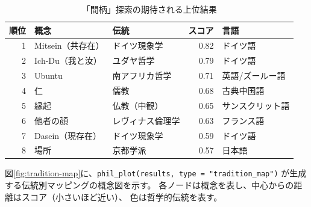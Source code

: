 \documentclass[a4paper,11pt]{ltjsarticle}
\begin{document}
\begin{table}[H]
\centering
\caption{「間柄」探索の期待される上位結果}
\label{tab:aidagara-results}
\small
\begin{tabular}{rllrl}
\toprule
\textbf{順位} & \textbf{概念} & \textbf{伝統} & \textbf{スコア} & \textbf{言語} \\
\midrule
1 & Mitsein（共存在） & ドイツ現象学 & 0.82 & ドイツ語 \\
2 & Ich-Du（我と汝） & ユダヤ哲学 & 0.79 & ドイツ語 \\
3 & Ubuntu & 南アフリカ哲学 & 0.71 & 英語/ズールー語 \\
4 & 仁 & 儒教 & 0.68 & 古典中国語 \\
5 & 縁起 & 仏教（中観） & 0.65 & サンスクリット語 \\
6 & 他者の顔 & レヴィナス倫理学 & 0.63 & フランス語 \\
7 & Dasein（現存在） & ドイツ現象学 & 0.59 & ドイツ語 \\
8 & 場所 & 京都学派 & 0.57 & 日本語 \\
\bottomrule
\end{tabular}
\end{table}

図\ref{fig:tradition-map}に、\texttt{phil\_plot(results, type = "tradition\_map")}
が生成する伝統別マッピングの概念図を示す。
各ノードは概念を表し、中心からの距離はスコア（小さいほど近い）、
色は哲学的伝統を表す。
\end{document}
